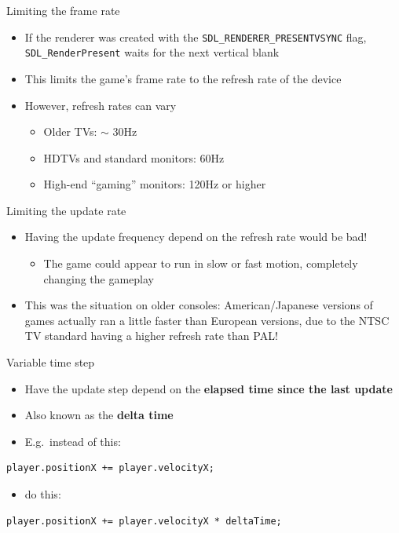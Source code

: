\begin{frame}{Limiting the frame rate}
    \begin{itemize}
        \item If the renderer was created with the \lstinline{SDL_RENDERER_PRESENTVSYNC} flag,
            \lstinline{SDL_RenderPresent} waits for the next vertical blank
        \item This limits the game's frame rate to the refresh rate of the device
        \item However, refresh rates can vary
            \begin{itemize}
                \item Older TVs: $\sim$ 30Hz
                \item HDTVs and standard monitors: 60Hz
                \item High-end ``gaming'' monitors: 120Hz or higher
            \end{itemize}
    \end{itemize}
\end{frame}

\begin{frame}{Limiting the update rate}
    \begin{itemize}
        \item Having the update frequency depend on the refresh rate would be bad!
            \begin{itemize}
                \item The game could appear to run in slow or fast motion,
                    completely changing the gameplay
            \end{itemize}
        \item This was the situation on older consoles:
            American/Japanese versions of games actually ran a little faster
            than European versions,
            due to the NTSC TV standard having a higher refresh rate than PAL!
    \end{itemize}
\end{frame}

\begin{frame}[fragile]{Variable time step}
    \begin{itemize}
        \item Have the update step depend on the \textbf{elapsed time since the last update}
        \item Also known as the \textbf{delta time}
        \item E.g.\ instead of this:
    \end{itemize}
    \begin{lstlisting}
player.positionX += player.velocityX;
    \end{lstlisting}
    \begin{itemize}
        \item do this:
    \end{itemize}
    \begin{lstlisting}
player.positionX += player.velocityX * deltaTime;
    \end{lstlisting}
\end{frame}

